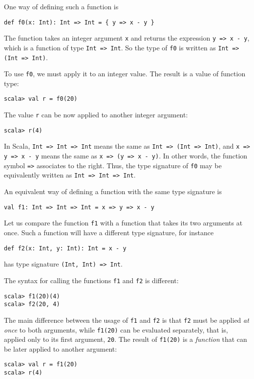 One way of defining such a function is
\begin{lstlisting}
def f0(x: Int): Int => Int = { y => x - y }
\end{lstlisting}

The function takes an integer argument \lstinline!x! and returns
the expression \lstinline!y => x - y!, which is a function of type
\lstinline!Int => Int!. So the type of \lstinline!f0! is written
as \lstinline!Int => (Int => Int)!.

To use \lstinline!f0!, we must apply it to an integer value. The
result is a value of function type:

\begin{lstlisting}
scala> val r = f0(20)
\end{lstlisting}
The value \lstinline!r! can be now applied to another integer argument:
\begin{lstlisting}
scala> r(4)
\end{lstlisting}

In Scala, \lstinline!Int => Int => Int! means the same as \lstinline!Int => (Int => Int)!,
and \lstinline!x => y => x - y! means the same as \lstinline!x => (y => x - y)!.
In other words, the function symbol \lstinline!=>! associates to
the right. Thus, the type signature of \lstinline!f0! may be equivalently
written as \lstinline!Int => Int => Int!.

An equivalent way of defining a function with the same type signature
is
\begin{lstlisting}
val f1: Int => Int => Int = x => y => x - y
\end{lstlisting}

Let us compare the function \lstinline!f1! with a function that takes
its two arguments at once. Such a function will have a different type
signature, for instance
\begin{lstlisting}
def f2(x: Int, y: Int): Int = x - y
\end{lstlisting}
has type signature \lstinline!(Int, Int) => Int!.

The syntax for calling the functions \lstinline!f1! and \lstinline!f2!
is different:
\begin{lstlisting}
scala> f1(20)(4)
scala> f2(20, 4)
\end{lstlisting}
The main difference between the usage of \lstinline!f1! and \lstinline!f2!
is that \lstinline!f2! must be applied \emph{at once} to both arguments,
while \lstinline!f1(20)! can be evaluated separately, \textendash{}
that is, applied only to its first argument, \lstinline!20!. The
result of \lstinline!f1(20)! is a \emph{function} that can be later
applied to another argument:
\begin{lstlisting}
scala> val r = f1(20)
scala> r(4)
\end{lstlisting}

